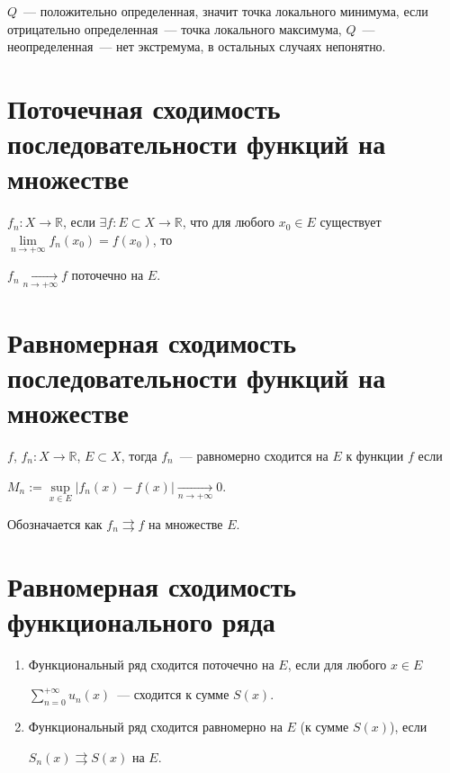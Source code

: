 \documentclass{article}
\begin{document}
        $Q$~--- положительно определенная, значит точка локального минимума, если отрицательно определенная~--- точка локального максимума, $Q$~--- неопределенная~--- нет экстремума, в остальных случаях непонятно.
        
    \newpage
    
    \section{Поточечная сходимость последовательности функций на множестве }
    
        $f_n : X \rightarrow \mathbb{R}$, если $\exists f : E \subset X \rightarrow \mathbb{R}$, что для любого $x_0 \in E$ существует $\lim\limits_{n \rightarrow +\infty} f_n(x_0) = f(x_0)$, то
        
        $f_n \xrightarrow[n \rightarrow +\infty]{} f$ поточечно на $E$.
        
    \newpage
    
    \section{Равномерная сходимость последовательности функций на множестве }
    
        $f$, $f_n : X \rightarrow \mathbb{R}$, $E \subset X$, тогда $f_n$~--- равномерно сходится на $E$ к функции $f$ если
        
        $M_n := \sup\limits_{x \in E} \left| f_n(x) - f(x) \right| \xrightarrow[n \rightarrow +\infty]{} 0$.
        
        Обозначается как $f_n \rightrightarrows f$ на множестве $E$.
        
    \newpage
    
    \section{Равномерная сходимость функционального ряда}
    
        \begin{enumerate}
        
            \item Функциональный ряд сходится поточечно на $E$, если для любого $x \in E$
            
                $\sum\limits^{+\infty}_{n = 0} u_n(x)$~--- сходится к сумме $S(x)$.
            
            \item Функциональный ряд сходится равномерно на $E$ (к сумме $S(x)$), если 
            
                $S_n(x) \rightrightarrows S(x)$ на $E$.
            
        \end{enumerate}
        
\end{document}
